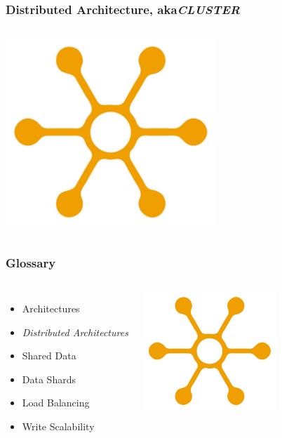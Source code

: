 \documentclass{beamer}
\begin{document}
\begin{frame}
  \frametitle{Distributed Architecture, aka\textit{CLUSTER}}

\begin{columns}[c]
  \includegraphics[height=19em]{distribution.jpg}
\end{columns}
\end{frame}

\begin{frame}
  \frametitle{Glossary}
  
  \vfill

\begin{columns}[c]

  \begin{itemize}
    \item Architectures
    \item \textit{Distributed Architectures}
    \item Shared Data
    \item Data Shards
    \item Load Balancing
    \item Write Scalability
  \end{itemize}  

\includegraphics[height=12em]{distribution.jpg}
\end{columns}
\end{frame}
\end{document}
